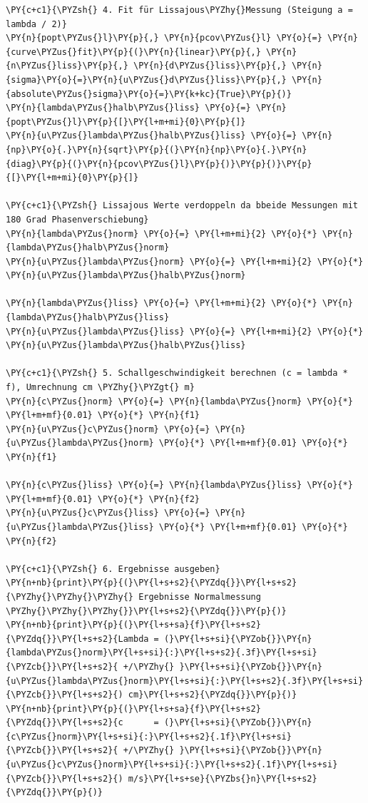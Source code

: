 \begin{tcolorbox}[breakable, size=fbox, boxrule=1pt, pad at break*=1mm,colback=cellbackground, colframe=cellborder]
\begin{Verbatim}[commandchars=\\\{\}]
\PY{c+c1}{\PYZsh{} 4. Fit für Lissajous\PYZhy{}Messung (Steigung a = lambda / 2)}
\PY{n}{popt\PYZus{}l}\PY{p}{,} \PY{n}{pcov\PYZus{}l} \PY{o}{=} \PY{n}{curve\PYZus{}fit}\PY{p}{(}\PY{n}{linear}\PY{p}{,} \PY{n}{n\PYZus{}liss}\PY{p}{,} \PY{n}{d\PYZus{}liss}\PY{p}{,} \PY{n}{sigma}\PY{o}{=}\PY{n}{u\PYZus{}d\PYZus{}liss}\PY{p}{,} \PY{n}{absolute\PYZus{}sigma}\PY{o}{=}\PY{k+kc}{True}\PY{p}{)}
\PY{n}{lambda\PYZus{}halb\PYZus{}liss} \PY{o}{=} \PY{n}{popt\PYZus{}l}\PY{p}{[}\PY{l+m+mi}{0}\PY{p}{]}
\PY{n}{u\PYZus{}lambda\PYZus{}halb\PYZus{}liss} \PY{o}{=} \PY{n}{np}\PY{o}{.}\PY{n}{sqrt}\PY{p}{(}\PY{n}{np}\PY{o}{.}\PY{n}{diag}\PY{p}{(}\PY{n}{pcov\PYZus{}l}\PY{p}{)}\PY{p}{)}\PY{p}{[}\PY{l+m+mi}{0}\PY{p}{]}

\PY{c+c1}{\PYZsh{} Lissajous Werte verdoppeln da bbeide Messungen mit 180 Grad Phasenverschiebung}
\PY{n}{lambda\PYZus{}norm} \PY{o}{=} \PY{l+m+mi}{2} \PY{o}{*} \PY{n}{lambda\PYZus{}halb\PYZus{}norm}
\PY{n}{u\PYZus{}lambda\PYZus{}norm} \PY{o}{=} \PY{l+m+mi}{2} \PY{o}{*} \PY{n}{u\PYZus{}lambda\PYZus{}halb\PYZus{}norm}

\PY{n}{lambda\PYZus{}liss} \PY{o}{=} \PY{l+m+mi}{2} \PY{o}{*} \PY{n}{lambda\PYZus{}halb\PYZus{}liss}
\PY{n}{u\PYZus{}lambda\PYZus{}liss} \PY{o}{=} \PY{l+m+mi}{2} \PY{o}{*} \PY{n}{u\PYZus{}lambda\PYZus{}halb\PYZus{}liss}

\PY{c+c1}{\PYZsh{} 5. Schallgeschwindigkeit berechnen (c = lambda * f), Umrechnung cm \PYZhy{}\PYZgt{} m}
\PY{n}{c\PYZus{}norm} \PY{o}{=} \PY{n}{lambda\PYZus{}norm} \PY{o}{*} \PY{l+m+mf}{0.01} \PY{o}{*} \PY{n}{f1}
\PY{n}{u\PYZus{}c\PYZus{}norm} \PY{o}{=} \PY{n}{u\PYZus{}lambda\PYZus{}norm} \PY{o}{*} \PY{l+m+mf}{0.01} \PY{o}{*} \PY{n}{f1}

\PY{n}{c\PYZus{}liss} \PY{o}{=} \PY{n}{lambda\PYZus{}liss} \PY{o}{*} \PY{l+m+mf}{0.01} \PY{o}{*} \PY{n}{f2}
\PY{n}{u\PYZus{}c\PYZus{}liss} \PY{o}{=} \PY{n}{u\PYZus{}lambda\PYZus{}liss} \PY{o}{*} \PY{l+m+mf}{0.01} \PY{o}{*} \PY{n}{f2}

\PY{c+c1}{\PYZsh{} 6. Ergebnisse ausgeben}
\PY{n+nb}{print}\PY{p}{(}\PY{l+s+s2}{\PYZdq{}}\PY{l+s+s2}{\PYZhy{}\PYZhy{}\PYZhy{} Ergebnisse Normalmessung \PYZhy{}\PYZhy{}\PYZhy{}}\PY{l+s+s2}{\PYZdq{}}\PY{p}{)}
\PY{n+nb}{print}\PY{p}{(}\PY{l+s+sa}{f}\PY{l+s+s2}{\PYZdq{}}\PY{l+s+s2}{Lambda = (}\PY{l+s+si}{\PYZob{}}\PY{n}{lambda\PYZus{}norm}\PY{l+s+si}{:}\PY{l+s+s2}{.3f}\PY{l+s+si}{\PYZcb{}}\PY{l+s+s2}{ +/\PYZhy{} }\PY{l+s+si}{\PYZob{}}\PY{n}{u\PYZus{}lambda\PYZus{}norm}\PY{l+s+si}{:}\PY{l+s+s2}{.3f}\PY{l+s+si}{\PYZcb{}}\PY{l+s+s2}{) cm}\PY{l+s+s2}{\PYZdq{}}\PY{p}{)}
\PY{n+nb}{print}\PY{p}{(}\PY{l+s+sa}{f}\PY{l+s+s2}{\PYZdq{}}\PY{l+s+s2}{c      = (}\PY{l+s+si}{\PYZob{}}\PY{n}{c\PYZus{}norm}\PY{l+s+si}{:}\PY{l+s+s2}{.1f}\PY{l+s+si}{\PYZcb{}}\PY{l+s+s2}{ +/\PYZhy{} }\PY{l+s+si}{\PYZob{}}\PY{n}{u\PYZus{}c\PYZus{}norm}\PY{l+s+si}{:}\PY{l+s+s2}{.1f}\PY{l+s+si}{\PYZcb{}}\PY{l+s+s2}{) m/s}\PY{l+s+se}{\PYZbs{}n}\PY{l+s+s2}{\PYZdq{}}\PY{p}{)}


\end{Verbatim}
\end{tcolorbox}

